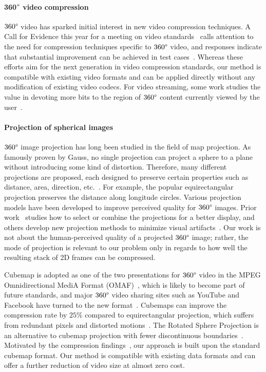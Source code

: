 \documentclass[journal,transmag]{IEEEtran}
\begin{document}
\paragraph{360$\degree$ video compression}$360\degree$ video has sparked initial interest in new video compression techniques.
A Call for Evidence this year for a meeting on video standards~\cite{cfe2017JVET} calls attention to the need for compression techniques specific to $360\degree$ video,
and responses indicate that substantial improvement can be achieved in test cases~\cite{JVET-G0023,JVET-G0024,JVET-G0025,JVET-G0026}.
Whereas these efforts aim for the next generation in video compression standards,
 our method is compatible with existing video formats and can be applied directly without any modification of existing video codecs.
For video streaming, some work studies the value in devoting more bits to the region of $360\degree$ content currently viewed by the user~\cite{sanchez2015panohevc,sreedhar2016adaptive}.

\paragraph{Projection of spherical images}\label{par:video_format}$360\degree$ image projection has long been studied in the field of map projection.
As famously proven by Gauss, no single projection can project a sphere to a plane without introducing some kind of distortion.
Therefore, many different projections are proposed,
each designed to preserve certain properties such as distance, area, direction, etc.~\cite{snyder1987map}.
For example, the popular equirectangular projection preserves the distance along longitude circles.
Various projection models have been developed to improve perceived quality for $360\degree$ images.
Prior work~\cite{zelnik2005squaring} studies how to select or combine the projections for a better display, and others develop new projection methods to minimize visual artifacts~\cite{kim-iccv2017,chang-iccv2013}.
Our work is not about the human-perceived quality of a projected $360\degree$ image; rather, the mode of projection is relevant to our problem only in regards to how well the resulting stack of 2D frames can be compressed.


Cubemap is adopted as one of the two presentations for $360\degree$ video in the MPEG Omnidirectional MediA Format (OMAF)~\cite{mpeg120},
which is likely to become part of future standards,
and major $360\degree$ video sharing sites such as YouTube and Facebook have turned to the new format~\cite{fb2015cubemap,google2017eac}.
Cubemaps can improve the compression rate by $25\%$ compared to equirectangular projection, which suffers from redundant pixels and distorted motions~\cite{fb2016compressionrate}.
The Rotated Sphere Projection is an alternative to cubemap projection with fewer discontinuous boundaries~\cite{adeel2017rsp}.
Motivated by the compression findings~\cite{fb2016compressionrate}, our approach is built upon the standard cubemap format.
Our method is compatible with existing data formats and can offer a further reduction of video size at almost zero cost.
\end{document}
